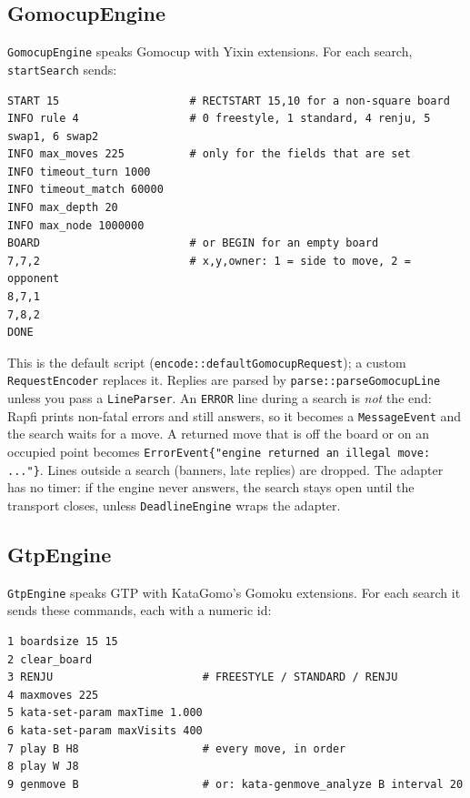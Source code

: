 \documentclass[11pt,a4paper]{article}
\newcommand{\code}[1]{\texttt{#1}}
\begin{document}
\subsection{GomocupEngine}

\code{GomocupEngine} speaks Gomocup with Yixin extensions. For each search, \code{startSearch}
sends:

\begin{lstlisting}[style=sh]
START 15                    # RECTSTART 15,10 for a non-square board
INFO rule 4                 # 0 freestyle, 1 standard, 4 renju, 5 swap1, 6 swap2
INFO max_moves 225          # only for the fields that are set
INFO timeout_turn 1000
INFO timeout_match 60000
INFO max_depth 20
INFO max_node 1000000
BOARD                       # or BEGIN for an empty board
7,7,2                       # x,y,owner: 1 = side to move, 2 = opponent
8,7,1
7,8,2
DONE
\end{lstlisting}

\noindent This is the default script (\code{encode::defaultGomocupRequest}); a custom
\code{RequestEncoder} replaces it. Replies are parsed by \code{parse::parseGomocupLine} unless you
pass a \code{LineParser}. An \code{ERROR} line during a search
is \emph{not} the end: Rapfi prints non-fatal errors and still answers, so it becomes a
\code{MessageEvent} and the search waits for a move. A returned move that is off the board or on an
occupied point becomes \code{ErrorEvent\{"engine returned an illegal move: ..."\}}. Lines outside a
search (banners, late replies) are dropped. The adapter has no timer: if the engine never answers,
the search stays open until the transport closes, unless \code{DeadlineEngine} wraps the adapter.

\subsection{GtpEngine}

\code{GtpEngine} speaks GTP with KataGomo's Gomoku extensions. For each search it sends these
commands, each with a numeric id:

\begin{lstlisting}[style=sh]
1 boardsize 15 15
2 clear_board
3 RENJU                       # FREESTYLE / STANDARD / RENJU
4 maxmoves 225
5 kata-set-param maxTime 1.000
6 kata-set-param maxVisits 400
7 play B H8                   # every move, in order
8 play W J8
9 genmove B                   # or: kata-genmove_analyze B interval 20
\end{lstlisting}
\end{document}
